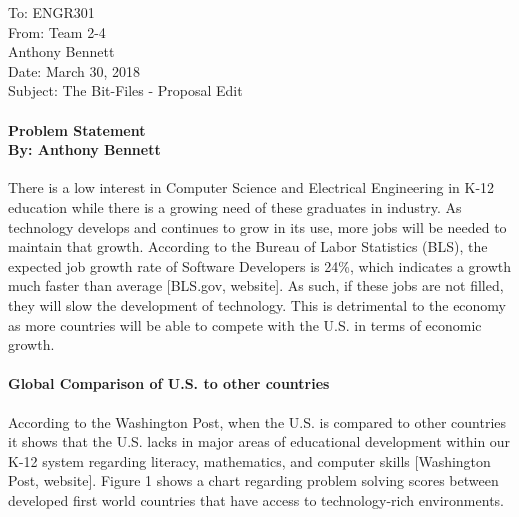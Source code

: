 \documentclass[12pt, letterpaper]{report}
\begin{document}
\thispagestyle{empty}

To: ENGR301\\
From: Team 2-4\\
\-\hspace{1.075cm} Anthony Bennett\\ 
Date: March 30, 2018\\
Subject: The Bit-Files - Proposal Edit

\paragraph*{\fontsize{14pt}{12pt}\selectfont Problem Statement \\  \fontsize{10pt}{12pt}\selectfont By: Anthony Bennett \\}
There is a low interest in Computer Science and Electrical Engineering in K-12 education while there is a growing need of these graduates in industry. As technology develops and continues to grow in its use, more jobs will be needed to maintain that growth. According to the Bureau of Labor Statistics (BLS), the expected job growth rate of Software Developers is 24\%, which indicates a growth much faster than average [BLS.gov, website]. As such, if these jobs are not filled, they will slow the development of technology. This is detrimental to the economy as more countries will be able to compete with the U.S. in terms of economic growth. 

\paragraph*{Global Comparison of U.S. to other countries \\ }
According to the Washington Post, when the U.S. is compared to other countries it shows that the U.S. lacks in major areas of educational development within our K-12 system regarding literacy, mathematics, and computer skills [Washington Post, website]. Figure 1 shows a chart regarding problem solving scores between developed first world countries that have access to technology-rich environments. 
\end{document}
